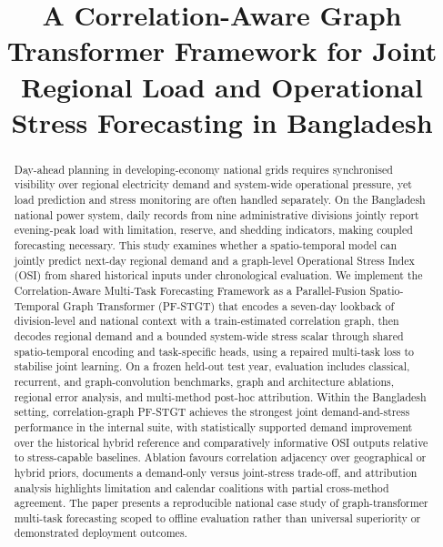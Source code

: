 \documentclass[conference]{IEEEtran}
\begin{document}
\title{A Correlation-Aware Graph Transformer Framework for Joint Regional Load and Operational Stress Forecasting in Bangladesh}



\maketitle

\begin{abstract}
Day-ahead planning in developing-economy national grids requires synchronised visibility over regional electricity demand and system-wide operational pressure, yet load prediction and stress monitoring are often handled separately. On the Bangladesh national power system, daily records from nine administrative divisions jointly report evening-peak load with limitation, reserve, and shedding indicators, making coupled forecasting necessary. This study examines whether a spatio-temporal model can jointly predict next-day regional demand and a graph-level Operational Stress Index (OSI) from shared historical inputs under chronological evaluation. We implement the Correlation-Aware Multi-Task Forecasting Framework as a Parallel-Fusion Spatio-Temporal Graph Transformer (PF-STGT) that encodes a seven-day lookback of division-level and national context with a train-estimated correlation graph, then decodes regional demand and a bounded system-wide stress scalar through shared spatio-temporal encoding and task-specific heads, using a repaired multi-task loss to stabilise joint learning. On a frozen held-out test year, evaluation includes classical, recurrent, and graph-convolution benchmarks, graph and architecture ablations, regional error analysis, and multi-method post-hoc attribution. Within the Bangladesh setting, correlation-graph PF-STGT achieves the strongest joint demand-and-stress performance in the internal suite, with statistically supported demand improvement over the historical hybrid reference and comparatively informative OSI outputs relative to stress-capable baselines. Ablation favours correlation adjacency over geographical or hybrid priors, documents a demand-only versus joint-stress trade-off, and attribution analysis highlights limitation and calendar coalitions with partial cross-method agreement. The paper presents a reproducible national case study of graph-transformer multi-task forecasting scoped to offline evaluation rather than universal superiority or demonstrated deployment outcomes.
\end{abstract}
\end{document}
